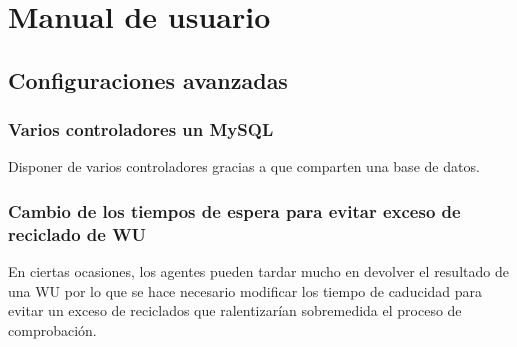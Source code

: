 \chapter{Manual de usuario} 

\section{Configuraciones avanzadas}\label{sec:conf_avanzada}

\subsection{Varios controladores un MySQL}
Disponer de varios controladores gracias a que comparten una base de datos.

\subsection{Cambio de los tiempos de espera para evitar exceso de reciclado de WU}
En ciertas ocasiones, los agentes pueden tardar mucho en devolver el resultado de una WU por lo que se hace necesario modificar los tiempo de caducidad para evitar un exceso de reciclados que ralentizarían sobremedida el proceso de comprobación.